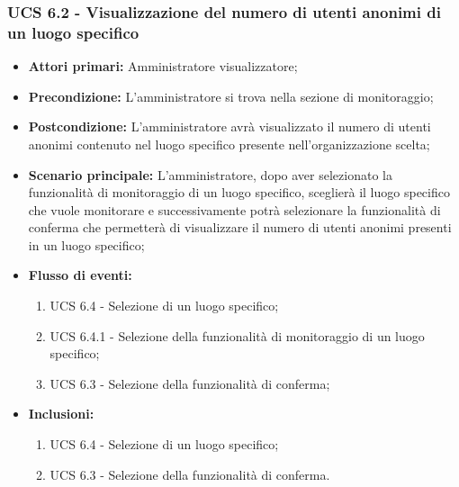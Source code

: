 \subsubsection{UCS 6.2 - Visualizzazione del numero di utenti anonimi di un luogo specifico}%
\begin{itemize}
	\item \textbf{Attori primari:} Amministratore visualizzatore;
	\item \textbf{Precondizione:} L'amministratore si trova nella sezione di monitoraggio;
	\item \textbf{Postcondizione:} L'amministratore avrà visualizzato il numero di utenti anonimi contenuto nel luogo specifico presente nell'organizzazione scelta;
	\item \textbf{Scenario principale:} L'amministratore, dopo aver selezionato la funzionalità di monitoraggio di un luogo specifico, sceglierà il luogo specifico che vuole monitorare e successivamente potrà selezionare la funzionalità di conferma che permetterà di visualizzare il numero di utenti anonimi presenti in un luogo specifico;
	\item \textbf{Flusso di eventi:} 
	\begin{enumerate}
		\item UCS 6.4 - Selezione di un luogo specifico;
		\item UCS 6.4.1 - Selezione della funzionalità di monitoraggio di un luogo specifico;
		\item UCS 6.3 - Selezione della funzionalità di conferma;
	\end{enumerate}
	\item \textbf{Inclusioni:}
	\begin{enumerate}
		\item UCS 6.4 - Selezione di un luogo specifico;
		\item UCS 6.3 - Selezione della funzionalità di conferma.
	\end{enumerate}
\end{itemize}

